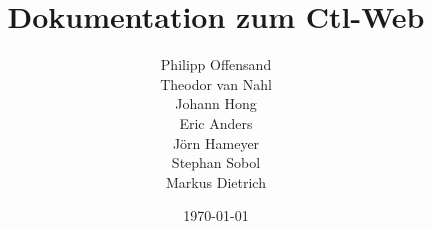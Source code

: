 \documentclass[12pt,a4paper]{book}
\begin{document}
\title{Dokumentation zum Ctl-Web}
\begin{center}
\author{
Philipp Offensand\\
Theodor van Nahl\\
Johann Hong\\
Eric Anders\\
Jörn Hameyer\\
Stephan Sobol\\
Markus Dietrich\\
}
\end{center}
\date{\today}



\maketitle
\tableofcontents

%
%

%
%
\end{document}
